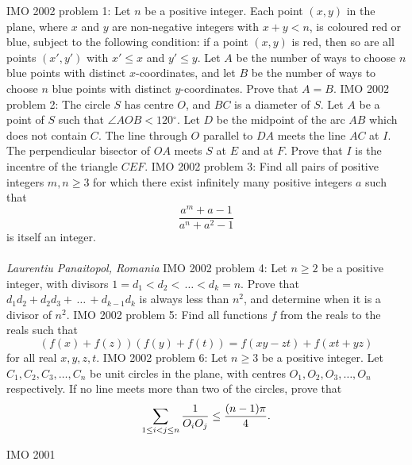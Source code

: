 IMO 2002 problem 1:  Let $n$ be a positive integer. Each point $(x,y)$ in the plane, where $x$ and $y$ are non-negative integers with $x+y<n$, is coloured red or blue, subject to the following condition: if a point $(x,y)$ is red, then so are all points $(x',y')$ with $x'\leq x$ and $y'\leq y$. Let $A$ be the number of ways to choose $n$ blue points with distinct $x$-coordinates, and let $B$ be the number of ways to choose $n$ blue points with distinct $y$-coordinates. Prove that $A=B$. 
IMO 2002 problem 2:  The circle $S$ has centre $O$, and $BC$ is a diameter of $S$. Let $A$ be a point of $S$ such that $\angle AOB<120{{}^\circ}$.  Let $D$ be the midpoint of the arc $AB$ which does not contain $C$. The line through $O$ parallel to $DA$ meets the line $AC$ at $I$. The perpendicular bisector of $OA$ meets $S$ at $E$ and at $F$. Prove that $I$ is the incentre of the triangle $CEF.$ 
IMO 2002 problem 3:  Find all pairs of positive integers $m,n\geq3$ for which there exist infinitely many positive integers $a$ such that
\[ \frac{a^m+a-1}{a^n+a^2-1} \]
is itself an integer. \\\\
\textit{Laurentiu Panaitopol, Romania} 
IMO 2002 problem 4:  Let $n\geq2$ be a positive integer, with divisors $1=d_1<d_2<\,\ldots<d_k=n$.  Prove that $d_1d_2+d_2d_3+\,\ldots\,+d_{k-1}d_k$ is always less than $n^2$, and determine when it is a divisor of $n^2$. 
IMO 2002 problem 5:  Find all functions $f$ from the reals to the reals such that
\[ \left(f(x)+f(z)\right)\left(f(y)+f(t)\right)=f(xy-zt)+f(xt+yz) \]
for all real $x,y,z,t$. 
IMO 2002 problem 6:  Let $n\geq3$ be a positive integer. Let $C_1,C_2,C_3,\ldots,C_n$ be unit circles in the plane, with centres $O_1,O_2,O_3,\ldots,O_n$ respectively. If no line meets more than two of the circles, prove that
\[ \sum\limits^{}_{1\leq i<j\leq n}{1\over O_iO_j}\leq{(n-1)\pi\over 4}. \] 

IMO 2001 


